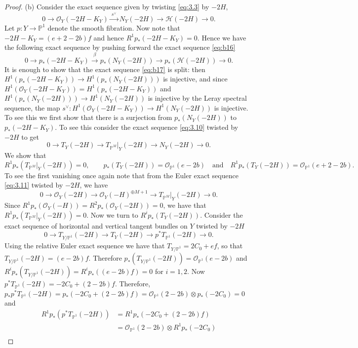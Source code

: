 \documentclass[11pt,twoside]{amsart}
\theoremstyle{plain}
\theoremstyle{definition}
\newcommand{\PP}{\mathbb{P}}
\newcommand{\PM}{\mathbb{P}^M}
\newcommand{\OO}{\mathcal{O}}
\newcommand{\NY}{N_{Y}}
\newcommand{\Hc}{\mathcal{H}}
\newcommand{\TP}{T_{\PM}|_Y}
\begin{document}
\begin{proof}
(b) Consider the exact sequence given by twisting \eqref{eq:3.3} by $-2H$,
\begin{equation}\label{eq:b16}
0\to\OO_Y(-2H-K_Y)\xrightarrow{\ s^{\vee}\ }\NY(-2H)\to\Hc(-2H)\to0 .
\end{equation}
Let $p\colon Y\to\PP^1$ denote the smooth fibration. Now note that $-2H-K_Y=(e+2-2b)f$ and hence $R^1p_*(-2H-K_Y)=0$. Hence we have the following exact sequence by pushing forward the exact sequence \eqref{eq:b16}
\begin{equation}\label{eq:b17}
0\to p_*(-2H-K_Y)\xrightarrow{\ \beta\ }p_*(\NY(-2H))\to p_*(\Hc(-2H))\to0 .
\end{equation}
It is enough to show that the exact sequence \eqref{eq:b17} is split: then $H^1(p_*(-2H-K_Y))\to H^1(p_*(\NY(-2H)))$ is injective, and since $H^1(\OO_Y(-2H-K_Y))=H^1(p_*(-2H-K_Y))$ and $H^1(p_*(\NY(-2H)))\to H^1(\NY(-2H))$ is injective by the Leray spectral sequence, the map $s^{\vee}\colon H^1(\OO_Y(-2H-K_Y))\to H^1(\NY(-2H))$ is injective. To see this we first show that there is a surjection from $p_*(\NY(-2H))$ to $p_*(-2H-K_Y)$. To see this consider the exact sequence \eqref{eq:3.10} twisted by $-2H$ to get
\begin{equation}\label{eq:b18}
0\to T_Y(-2H)\to\TP(-2H)\to\NY(-2H)\to0 .
\end{equation}
We show that
\[
R^1p_*(\TP(-2H))=0,\qquad p_*(T_Y(-2H))=\OO_{\PP^1}(e-2b)\quad\text{and}\quad R^1p_*(T_Y(-2H))=\OO_{\PP^1}(e+2-2b) .
\]
To see the first vanishing once again note that from the Euler exact sequence \eqref{eq:3.11} twisted by $-2H$, we have
\[
0\to\OO_Y(-2H)\to\OO_Y(-H)^{\oplus M+1}\to\TP(-2H)\to0 .
\]
Since $R^1p_*(\OO_Y(-H))=R^2p_*(\OO_Y(-2H))=0$, we have that $R^1p_*(\TP(-2H))=0$. Now we turn to $R^ip_*(T_Y(-2H))$. Consider the exact sequence of horizontal and vertical tangent bundles on $Y$ twisted by $-2H$
\begin{equation}\label{eq:b19}
0\to T_{Y/\PP^1}(-2H)\to T_Y(-2H)\to p^*T_{\PP^1}(-2H)\to0 .
\end{equation}
Using the relative Euler exact sequence we have that $T_{Y/\PP^1}=2C_0+ef$, so that $T_{Y/\PP^1}(-2H)=(e-2b)f$. Therefore $p_*(T_{Y/\PP^1}(-2H))=\OO_{\PP^1}(e-2b)$ and $R^ip_*(T_{Y/\PP^1}(-2H))=R^ip_*((e-2b)f)=0$ for $i=1,2$. Now $p^*T_{\PP^1}(-2H)=-2C_0+(2-2b)f$. Therefore, $p_*p^*T_{\PP^1}(-2H)=p_*(-2C_0+(2-2b)f)=\OO_{\PP^1}(2-2b)\otimes p_*(-2C_0)=0$ and
\begin{align*}
R^1p_*(p^*T_{\PP^1}(-2H))&=R^1p_*(-2C_0+(2-2b)f)\\
&=\OO_{\PP^1}(2-2b)\otimes R^1p_*(-2C_0)\\

\end{align*}
\end{proof}
\end{document}
